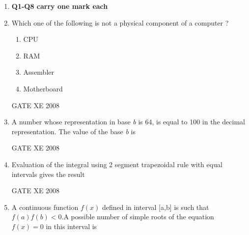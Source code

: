 \documentclass[12pt]{article}
\begin{document}
\begin{enumerate}
\item[] \textbf{Q1-Q8 carry one mark each}
\item  Which one of the following is not a physical component of a computer ?

\begin{enumerate}

\item  CPU 
\item  RAM
\item  Assembler 
\item  Motherboard
\end{enumerate}

GATE XE 2008
\item A number whose representation in base \textit{b}  is 64, is equal to 100 in the decimal representation. The value of the base \textit{b} is

\begin{enumerate}
\end{enumerate}

GATE XE 2008
\item Evaluation of the integral \newline using 2 segment trapezoidal rule with equal intervals gives the result

\begin{enumerate}
\end{enumerate}

GATE XE 2008
\item A continuous function $f(x)$ defined in interval [a,b] is such that $f(a)f(b)<0$.A possible number of simple roots of the equation $f(x)=0$ in this interval is

\begin{enumerate}
\end{enumerate}


\end{enumerate}
\end{document}

